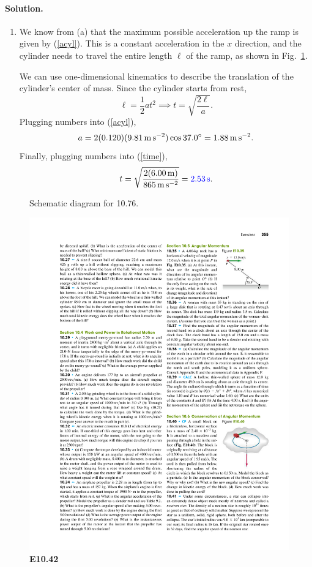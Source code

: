 \documentclass[11pt]{article}
\newcommand{\refeq}[1]{(\ref{#1})}
\newcommand{\beq}{\begin{equation*}}
\newcommand{\eeq}{\end{equation*}}
\newcommand{\beqn}{\begin{equation}}
\newcommand{\eeqn}{\end{equation}}
\newenvironment{solution}
{
    \paragraph{Solution.}
    \ignorespaces
}
{
    \bigskip
}
\begin{document}
\begin{solution}
\begin{enumerate}
		\item We know from (a) that the maximum possible acceleration up the ramp is given by \refeq{acyl}.  This is a constant acceleration in the $x$ direction, and the cylinder needs to travel the entire length $\ell$ of the ramp, as shown in Fig.~\ref{P10.76c}.
		
			We can use one-dimensional kinematics to describe the translation of the cylinder's center of mass.  Since the cylinder starts from rest,
			\beqn \label{time}
				\ell = \frac{1}{2} a t^2 \implies t = \sqrt{\frac{2 \ell}{a}}.
			\eeqn
			Plugging numbers into \refeq{acyl},
			\beq
				a = 2 (0.120) (\sig) \cos{37.0^\circ} = \SI{1.88}{\meter\per\square\second}.
			\eeq
			Finally, plugging numbers into \refeq{time},
			\beq
				t = \sqrt{\frac{2 (\SI{6.00}{\meter})}{\SI{865}{\meter\per\square\second}}} = {\color{blue} \SI{2.53}{\second}}.
			\eeq
	\end{enumerate}
\end{solution}

\begin{figure}[b]
	\caption{Schematic diagram for 10.76.}
	\label{P10.76c}
\end{figure}


\clearpage
\begin{figure} \centering
	\includegraphics{E10-42}
	\caption{\textbf{E10.42}}
	\label{E10.42}
\end{figure}
\end{document}
